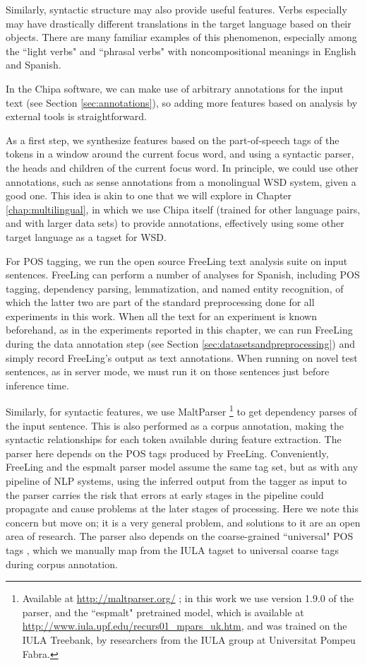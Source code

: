 Similarly, syntactic structure may also provide useful features.  Verbs
especially may have drastically different translations in the target language
based on their objects. There are many familiar examples of this phenomenon,
especially among the ``light verbs" and ``phrasal verbs" with noncompositional
meanings in English and Spanish.

In the Chipa software, we can make use of arbitrary annotations for the input
text (see Section \ref{sec:annotations}), so adding more features based on
analysis by external tools is straightforward.

As a first step, we synthesize features based on the part-of-speech tags of the
tokens in a window around the current focus word, and using a syntactic parser,
the heads and children of the current focus word. In principle, we could use
other annotations, such as sense annotations from a monolingual WSD system,
given a good one. This idea is akin to one that we will explore in Chapter
\ref{chap:multilingual}, in which we use Chipa itself (trained for other
language pairs, and with larger data sets) to provide annotations, effectively
using some other target language as a tagset for WSD.

For POS tagging, we run the open source FreeLing text analysis suite
\cite{padro12} on input sentences. FreeLing can perform a number of analyses
for Spanish, including POS tagging, dependency parsing, lemmatization, and
named entity recognition, of which the latter two are part of the standard
preprocessing done for all experiments in this work. When all the text for an
experiment is known beforehand, as in the experiments reported in this chapter,
we can run FreeLing during the data annotation step (see Section
\ref{sec:datasetsandpreprocessing}) and simply record FreeLing's output as text
annotations. When running on novel test sentences, as in server mode, we must
run it on those sentences just before inference time.

Similarly, for syntactic features, we use MaltParser\cite{Nivre06maltparser:a}
\footnote{Available at \url{http://maltparser.org/} ; in this work we use
version 1.9.0 of the parser, and the ``espmalt" pretrained model, which is
available at \url{http://www.iula.upf.edu/recurs01_mpars_uk.htm}, and was
trained on the IULA Treebank\cite{MARIMON12.519}, by researchers from the IULA
group at Universitat Pompeu Fabra.} to get dependency parses of the input
sentence. This is also performed as a corpus annotation, making the syntactic
relationships for each token available during feature extraction. The parser
here depends on the POS tags produced by FreeLing. Conveniently, FreeLing and
the espmalt parser model assume the same tag set, but as with any pipeline of
NLP systems, using the inferred output from the tagger as input to the parser
carries the risk that errors at early stages in the pipeline could propagate
and cause problems at the later stages of processing. Here we note this concern
but move on; it is a very general problem, and solutions to it are an open area
of research. The parser also depends on the coarse-grained ``universal" POS
tags \cite{PETROV12.274}, which we manually map from the IULA tagset to
universal coarse tags during corpus annotation.

